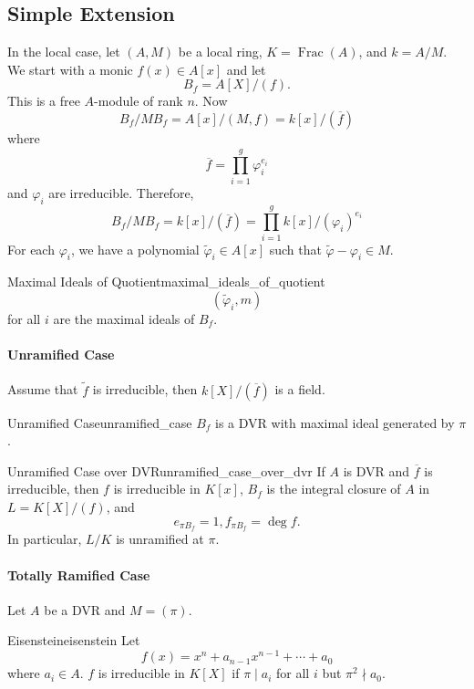 \documentclass{article}
\begin{document}
\subsection{Simple Extension}

In the local case, let $(A,M)$ be a local ring, $K = \operatorname{Frac}(A)$, and $k = A/M$.
We start with a monic $f(x)\in A[x]$ and let
\[ B_f = A[X]/(f). \]
This is a free $A$-module of rank $n$.
Now
\[ B_f/MB_f = A[x]/(M,f) = k[x]/(\overline{f}) \]
where
\[ \overline{f} = \prod_{i=1}^g \varphi_i^{e_i} \]
and $\varphi_i$ are irreducible.
Therefore,
\[ B_f/MB_f = k[x]/(\overline{f}) = \prod_{i=1}^g k[x]/(\varphi_i)^{e_i} \]
For each $\varphi_i$, we have a polynomial $\tilde{\varphi}_i \in A[x]$ such that $\tilde{\varphi} - \varphi_i \in M$.

\begin{proposition}{Maximal Ideals of Quotient}{maximal_ideals_of_quotient}
    \[ (\tilde{\varphi}_i,m) \]
    for all $i$ are the maximal ideals of $B_f$.
\end{proposition}

\paragraph*{Unramified Case}
Assume that $\tilde{f}$ is irreducible, then $k[X]/(\overline{f})$ is a field.

\begin{proposition}{Unramified Case}{unramified_case}
    $B_f$ is a DVR with maximal ideal generated by $\pi$.
\end{proposition}

\begin{corollary}{Unramified Case over DVR}{unramified_case_over_dvr}
    If $A$ is DVR and $\overline{f}$ is irreducible, then $f$ is irreducible in $K[x]$, $B_f$ is the integral closure of $A$ in $L=K[X]/(f)$, and
    \[ e_{\pi B_f} = 1, f_{\pi B_f} = \deg f. \]
    In particular, $L/K$ is unramified at $\pi$.
\end{corollary}

\paragraph*{Totally Ramified Case}
Let $A$ be a DVR and $M = (\pi)$.
\begin{theorem}{Eisenstein}{eisenstein}
    Let
    \[ f(x) = x^n + a_{n-1}x^{n-1} + \cdots + a_0 \]
    where $a_i\in A$.
    $f$ is irreducible in $K[X]$ if $\pi\mid a_i$ for all $i$ but $\pi^2 \nmid a_0$.
\end{theorem}
\end{document}
